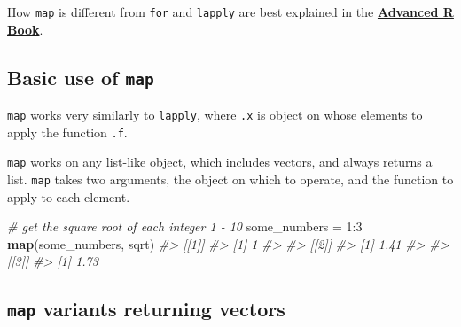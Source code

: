 \documentclass[]{book}
\newenvironment{Shaded}{}{}
\newcommand{\CommentTok}[1]{\textcolor[rgb]{0.38,0.63,0.69}{\textit{#1}}}
\newcommand{\DataTypeTok}[1]{\textcolor[rgb]{0.56,0.13,0.00}{#1}}
\newcommand{\DecValTok}[1]{\textcolor[rgb]{0.25,0.63,0.44}{#1}}
\newcommand{\KeywordTok}[1]{\textcolor[rgb]{0.00,0.44,0.13}{\textbf{#1}}}
\newcommand{\NormalTok}[1]{#1}
\newcommand{\OperatorTok}[1]{\textcolor[rgb]{0.40,0.40,0.40}{#1}}
\newcommand{\StringTok}[1]{\textcolor[rgb]{0.25,0.44,0.63}{#1}}
\begin{document}
How \texttt{map} is different from \texttt{for} and \texttt{lapply} are best explained in the \textbf{\href{https://adv-r.hadley.nz/functionals.html}{Advanced R Book}}.

\hypertarget{basic-use-of-map}{%
\subsection{\texorpdfstring{Basic use of \texttt{map}}{Basic use of map}}\label{basic-use-of-map}}

\texttt{map} works very similarly to \texttt{lapply}, where \texttt{.x} is object on whose elements to apply the function \texttt{.f}.

\begin{Shaded}
\end{Shaded}

\texttt{map} works on any list-like object, which includes vectors, and always returns a list. \texttt{map} takes two arguments, the object on which to operate, and the function to apply to each element.

\begin{Shaded}
\begin{Highlighting}[]
\CommentTok{# get the square root of each integer 1 - 10}
\NormalTok{some_numbers =}\StringTok{ }\DecValTok{1}\OperatorTok{:}\DecValTok{3}
\KeywordTok{map}\NormalTok{(some_numbers, sqrt)}
\CommentTok{#> [[1]]}
\CommentTok{#> [1] 1}
\CommentTok{#> }
\CommentTok{#> [[2]]}
\CommentTok{#> [1] 1.41}
\CommentTok{#> }
\CommentTok{#> [[3]]}
\CommentTok{#> [1] 1.73}
\end{Highlighting}
\end{Shaded}

\hypertarget{map-variants-returning-vectors}{%
\subsection{\texorpdfstring{\texttt{map} variants returning vectors}{map variants returning vectors}}\label{map-variants-returning-vectors}}
\end{document}

